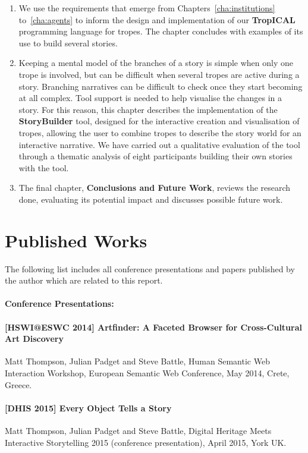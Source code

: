 \documentclass[11pt]{report}
\begin{document}
\begin{enumerate}[{Chapter} 1:]
{    2015]} paper.
\item We use the requirements that emerge from Chapters~\ref{cha:institutions}
  to~\ref{cha:agents} to inform the design and implementation of our \textbf{TropICAL} programming
  language for tropes. The chapter concludes with examples of its use to build several stories.
\item
  Keeping a mental model of the branches of a story is simple when only one
  trope is involved, but can be difficult when several tropes are active during a story.
  Branching narratives can be difficult to check once they start becoming at all
  complex. Tool support is needed to help visualise the changes in a
  story. For
  this reason, this chapter describes the implementation of the \textbf{StoryBuilder} tool,
  designed for the interactive creation and visualisation of tropes, allowing
  the user to combine tropes to describe the story world for an interactive
  narrative. We have carried out a qualitative evaluation of the tool
  through a thematic analysis of eight participants building their own stories
  with the tool.
\item The final chapter, \textbf{Conclusions and Future Work}, reviews the
  research done, evaluating its potential impact and discusses possible future work.
\end{enumerate}


\section{Published Works}
\label{sec:papers}

  The following list includes all conference presentations and papers published by the author which are related to this report.

  \paragraph{Conference Presentations:}
  \paragraph{[HSWI@ESWC 2014] Artfinder: A Faceted Browser for Cross-Cultural Art Discovery} Matt Thompson, Julian Padget and Steve Battle, Human Semantic Web Interaction Workshop, European Semantic Web Conference, May 2014, Crete, Greece.\label{pub:hswi}
  \paragraph{[DHIS 2015] Every Object Tells a Story} Matt Thompson, Julian Padget and Steve Battle, Digital Heritage Meets Interactive Storytelling 2015 (conference presentation), April 2015, York UK.\label{pub:dhis}
\end{document}
